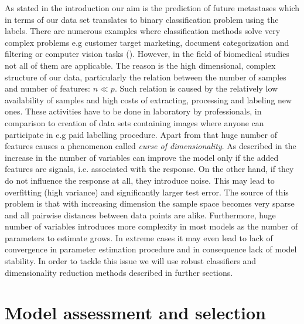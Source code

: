 \documentclass[shortabstract, english, mgr]{iithesis}
\begin{document}
As stated in the introduction our aim is the prediction of future metastases which in terms of our data set translates to binary classification problem using the labels. There are numerous examples where classification methods solve very complex problems e.g customer target marketing, document categorization and filtering or computer vision tasks (\cite{dataClassification}). However, in the field of biomedical studies not all of them are applicable. The reason is the high dimensional, complex structure of our data, particularly the relation between the number of samples and number of features: $n \ll p$. Such relation is caused by the relatively low availability of samples and high costs of extracting, processing and labeling new ones. These activities have to be done in laboratory by professionals, in comparison to creation of data sets containing images where anyone can participate in e.g paid labelling procedure. Apart from that huge number of features causes a phenomenon called \textit{curse of dimensionality}. As described in \cite[chapter 6.4.3]{ISL} the increase in the number of variables can improve the model only if the added features are signals, i.e. associated with the response. On the other hand, if they do not influence the response at all, they introduce noise. This may lead to overfitting (high variance) and significantly larger test error. The source of this problem is that with increasing dimension the sample space becomes very sparse and all pairwise distances between data points are alike. Furthermore, huge number of variables introduces more complexity in most models as the number of parameters to estimate grows. In extreme cases it may even lead to lack of convergence in parameter estimation procedure and in consequence lack of model stability. In order to tackle this issue we will use robust classifiers and dimensionality reduction methods described in further sections.

\section{Model assessment and selection} \label{section:selection}
\end{document}
